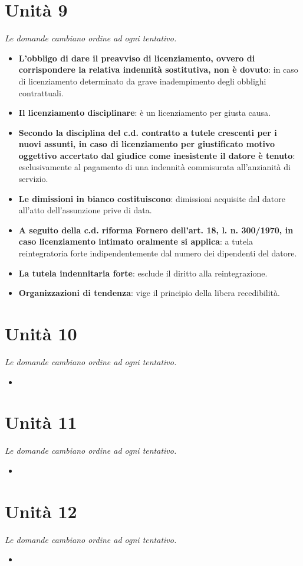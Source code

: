 \documentclass[12pt, a4paper]{report}
\begin{document}
\chapter{Unità 9}
    \textit{Le domande cambiano ordine ad ogni tentativo.}
    \begin{itemize}
        \item \textbf{L’obbligo di dare il preavviso di licenziamento, ovvero di corrispondere la relativa indennità sostitutiva, non è dovuto}: in caso di licenziamento determinato da grave inadempimento degli obblighi contrattuali.
        \item \textbf{Il licenziamento disciplinare}: è un licenziamento per giusta causa.
        \item \textbf{Secondo la disciplina del c.d. contratto a tutele crescenti per i nuovi assunti, in caso di licenziamento per giustificato motivo oggettivo accertato dal giudice come inesistente il datore è tenuto}: esclusivamente al pagamento di una indennità commisurata all’anzianità di servizio.
        \item \textbf{Le dimissioni in bianco costituiscono}: dimissioni acquisite dal datore all’atto dell’assunzione prive di data.
        \item \textbf{A seguito della c.d. riforma Fornero dell’art. 18, l. n. 300/1970, in caso licenziamento intimato oralmente si applica}: a tutela reintegratoria forte indipendentemente dal numero dei dipendenti del datore.
        \item \textbf{La tutela indennitaria forte}: esclude il diritto alla reintegrazione.
        \item \textbf{Organizzazioni di tendenza}: vige il principio della libera recedibilità.
    \end{itemize}
\chapter{Unità 10}
    \textit{Le domande cambiano ordine ad ogni tentativo.}
    \begin{itemize}
        \item
    \end{itemize}
\chapter{Unità 11}
    \textit{Le domande cambiano ordine ad ogni tentativo.}
    \begin{itemize}
        \item 
    \end{itemize}
\chapter{Unità 12}
    \textit{Le domande cambiano ordine ad ogni tentativo.}
    \begin{itemize}
        \item 
    \end{itemize}
\end{document}
